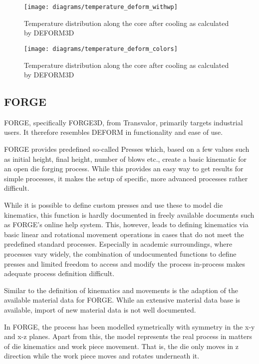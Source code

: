 \begin{figure}[tb]
  \centering
  \texttt{[image: diagrams/temperature\_deform\_withwp]}
  \caption{Temperature distribution along the core after cooling as calculated by DEFORM3D}
  \label{img:temp_deform}
\end{figure}

\begin{figure}[tb]
  \centering
  \texttt{[image: diagrams/temperature\_deform\_colors]}
  \caption{Temperature distribution along the core after cooling as calculated by DEFORM3D}
  \label{img:temp_deform_colors}
\end{figure}

\subsection{FORGE}
FORGE, specifically FORGE3D, from Transvalor, primarily targets industrial users. It therefore resembles DEFORM in functionality and ease of use.

FORGE provides predefined so-called Presses which, based on a few values such as initial height, final height, number of blows etc., create a basic kinematic for an open die forging process. While this provides an easy way to get results for simple processes, it makes the setup of specific, more advanced processes rather difficult.

While it is possible to define custom presses and use these to model die kinematics, this function is hardly documented in freely available documents such as FORGE's online help system. This, however, leads to defining kinematics via basic linear and rotational movement operations in cases that do not meet the predefined standard processes. Especially in academic surroundings, where processes vary widely, the combination of undocumented functions to define presses and limited freedom to access and modify the process in-process makes adequate process definition difficult.

Similar to the definition of kinematics and movements is the adaption of the available material data for FORGE. While an extensive material data base is available, import of new material data is not well documented.

In FORGE, the process has been modelled symetrically with symmetry in the x-y and x-z planes. Apart from this, the model represents the real process in matters of die kinematics and work piece movement. That is, the die only moves in z direction while the work piece moves and rotates underneath it.

